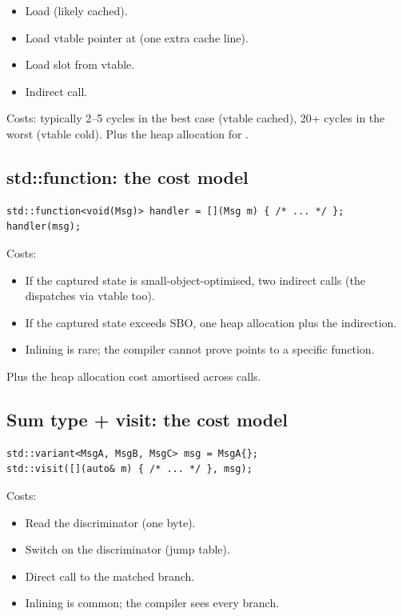 \begin{itemize}[leftmargin=*]
  \item Load  (likely cached).
  \item Load vtable pointer at  (one extra cache line).
  \item Load  slot from vtable.
  \item Indirect call.
\end{itemize}

Costs: typically 2--5 cycles in the best case (vtable cached),
20+ cycles in the worst (vtable cold). Plus the heap allocation
for .

\subsection*{std::function: the cost model}

\begin{lstlisting}
std::function<void(Msg)> handler = [](Msg m) { /* ... */ };
handler(msg);
\end{lstlisting}

Costs:

\begin{itemize}[leftmargin=*]
  \item If the captured state is small-object-optimised, two
    indirect calls (the  dispatches via vtable
    too).
  \item If the captured state exceeds SBO, one heap allocation
    plus the indirection.
  \item Inlining is rare; the compiler cannot prove
     points to a specific function.
\end{itemize}

Plus the heap allocation cost amortised across calls.

\subsection*{Sum type + visit: the cost model}

\begin{lstlisting}
std::variant<MsgA, MsgB, MsgC> msg = MsgA{};
std::visit([](auto& m) { /* ... */ }, msg);
\end{lstlisting}

Costs:

\begin{itemize}[leftmargin=*]
  \item Read the discriminator (one byte).
  \item Switch on the discriminator (jump table).
  \item Direct call to the matched branch.
  \item Inlining is common; the compiler sees every branch.
\end{itemize}

